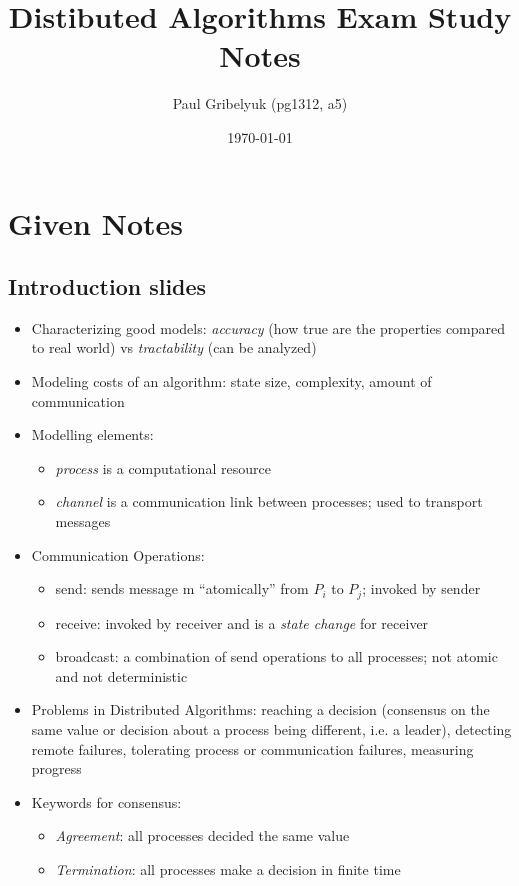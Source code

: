 \documentclass[a4paper,10pt,]{article}
\author{Paul Gribelyuk (pg1312, a5)}
\title{Distibuted Algorithms Exam Study Notes}
\date{\today}
\begin{document}
\maketitle

\section{Given Notes}
\subsection{Introduction slides}
\begin{itemize}
  \item Characterizing good models: \emph{accuracy} (how true are the properties compared to real world) vs \emph{tractability} (can be analyzed)
  \item Modeling costs of an algorithm: state size, complexity, amount of communication
  \item Modelling elements:
  \begin{itemize}
    \item \emph{process} is a computational resource
    \item \emph{channel} is a communication link between processes; used to transport messages
  \end{itemize}
  \item Communication Operations:
  \begin{itemize}
    \item send: sends message m ``atomically'' from $P_i$ to $P_j$; invoked by sender
    \item receive: invoked by receiver and is a \emph{state change} for receiver
    \item broadcast: a combination of send operations to all processes; not atomic and not deterministic
  \end{itemize}
  \item Problems in Distributed Algorithms: reaching a decision (consensus on the same value or decision about a process being different, i.e. a leader), detecting remote failures, tolerating process or communication failures, measuring progress
  \item Keywords for consensus:
  \begin{itemize}
    \item \emph{Agreement}: all processes decided the same value
    \item \emph{Termination}: all processes make a decision in finite time

\end{itemize}
\end{itemize}
\end{document}
